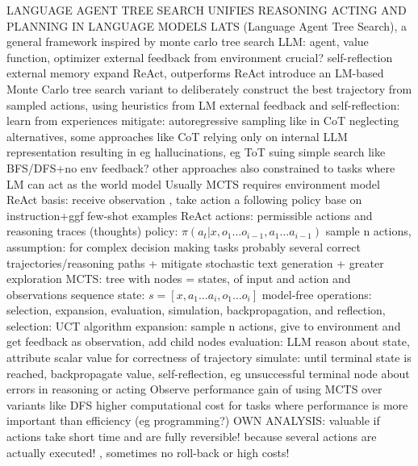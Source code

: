 \documentclass{article}
\begin{document}
\cite{zhou_language_2023} LANGUAGE AGENT TREE SEARCH UNIFIES REASONING ACTING AND PLANNING IN LANGUAGE MODELS
LATS (Language Agent Tree Search), a general framework
inspired by monte carlo tree search
LLM: agent, value function, optimizer
external feedback from environment crucial?
self-reflection
external memory
expand ReAct, outperforms ReAct
introduce an LM-based Monte Carlo tree search variant to deliberately construct the best trajectory from sampled actions, using heuristics from LM
external feedback and self-reflection: learn from experiences
mitigate: autoregressive sampling like in CoT neglecting alternatives,  some approaches like CoT relying only on internal LLM representation resulting in eg hallucinations, eg ToT suing simple search like BFS/DFS+no env feedback?
other approaches also constrained to tasks where LM can act as the world model
Usually MCTS requires environment model
ReAct basis: receive observation , take action a following policy base on instruction+ggf few-shot examples
ReAct actions: permissible actions and reasoning traces (thoughts)
policy: $\pi(a_{t} | x, o_{1} \ldots o_{i-1}, a_{1} \ldots a_{i-1})$
sample n actions, assumption: for complex decision making tasks probably several correct trajectories/reasoning paths + mitigate stochastic text generation + greater exploration
MCTS: tree with nodes = states, of input and action and observations sequence
state: $s = [x, a_{1} \ldots a_{i}, o_{1} \ldots o_{i}]$
model-free
operations: selection, expansion, evaluation, simulation, backpropagation, and reflection,
selection: UCT algorithm
expansion: sample n actions, give to environment and get feedback as observation, add child nodes
evaluation: LLM reason about state, attribute scalar value for correctness of trajectory
simulate: until terminal state is reached, backpropagate value, self-reflection, eg unsuccessful terminal node about errors in reasoning or acting
Observe performance gain of using MCTS over variants like DFS
higher computational cost
for tasks where performance is more important than efficiency (eg programming?)
OWN ANALYSIS: valuable if actions take short time and are fully reversible! because several actions are actually executed! , sometimes no roll-back or high costs!
\end{document}
